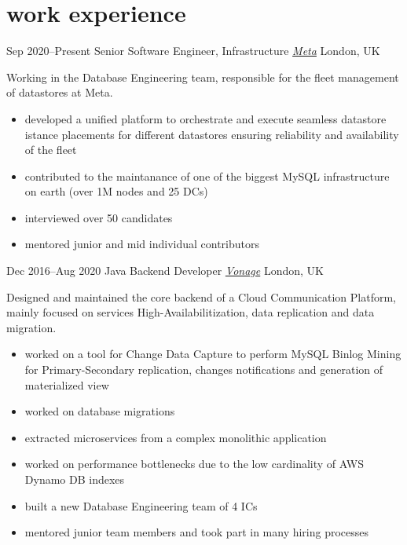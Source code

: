 \vspace{-.4cm}
\section{\normalfont work experience}

\begin{entrylist}
\entry
{Sep 2020--Present}
{Senior Software Engineer, Infrastructure {\normalfont \emph{\href{https://www.meta.com/}{Meta}}}}
{London, UK}
{Working in the Database Engineering team, responsible for the fleet management of datastores at Meta. 
\vspace{-.2cm}
\begin{itemize}[leftmargin=.6cm]
	\item developed a unified platform to orchestrate and execute seamless datastore istance placements for different datastores ensuring reliability and availability of the fleet
	\item contributed to the maintanance of one of the biggest MySQL infrastructure on earth (over 1M nodes and 25 DCs)
	\item interviewed over 50 candidates  
	\item mentored junior and mid individual contributors
\end{itemize}
}


\entry
{Dec 2016--Aug 2020}
{Java Backend Developer {\normalfont \emph{\href{https://www.vonage.com/business/}{Vonage}}}}
{London, UK}
{Designed and maintained the core backend of a Cloud Communication Platform, mainly focused on services High-Availabilitization, data replication and data migration.
\vspace{-.2cm}
\begin{itemize}[leftmargin=.6cm]
	\item worked on a tool for Change Data Capture to perform MySQL Binlog Mining for Primary-Secondary replication, changes notifications and generation of materialized view 
	\item worked on database migrations
	\item extracted microservices from a complex monolithic application
	\item worked on performance bottlenecks due to the low cardinality of AWS Dynamo DB indexes
	\item built a new Database Engineering team of 4 ICs 
	\item mentored junior team members and took part in many hiring processes
\end{itemize}
}


\end{entrylist}
